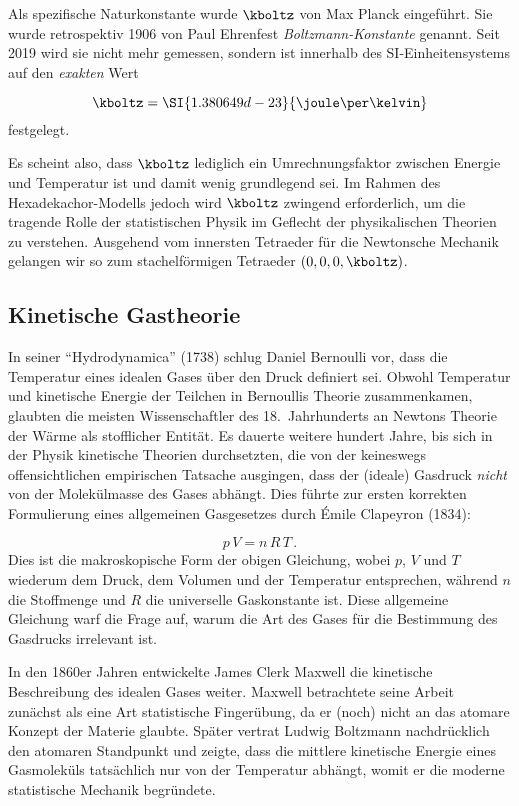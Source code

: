 \documentclass{scrartcl}
\begin{document}
Als spezifische Naturkonstante wurde $\kboltz$ von Max Planck eingeführt. Sie wurde retrospektiv 1906 von Paul Ehrenfest \emph{Boltzmann-Konstante} genannt. Seit 2019 wird sie nicht mehr gemessen, sondern ist innerhalb des SI-Einheitensystems auf den \emph{exakten} Wert

\begin{equation*}
  \kboltz=\SI{1.380649d-23}{\joule \per \kelvin}
\end{equation*}
%
festgelegt.

Es scheint also, dass $\kboltz$ lediglich ein Umrechnungsfaktor zwischen Energie und Temperatur ist und damit wenig grundlegend sei. Im Rahmen des Hexadekachor-Modells jedoch wird $\kboltz$ zwingend erforderlich, um die tragende Rolle der statistischen Physik im Geflecht der physikalischen Theorien zu verstehen. Ausgehend vom innersten Tetraeder für die Newtonsche Mechanik gelangen wir so zum stachelförmigen Tetraeder $(0,0,0,\kboltz)$.


\subsection*{Kinetische Gastheorie}

In seiner \enquote{Hydrodynamica} (1738) schlug Daniel Bernoulli vor, dass die Temperatur eines idealen Gases über den Druck definiert sei. Obwohl Temperatur und kinetische Energie der Teilchen in Bernoullis Theorie zusammenkamen, glaubten die meisten Wissenschaftler des 18.\ Jahrhunderts an Newtons Theorie der Wärme als stofflicher Entität. Es dauerte weitere hundert Jahre, bis sich in der Physik kinetische Theorien durchsetzten, die von der keineswegs offensichtlichen empirischen Tatsache ausgingen, dass der (ideale) Gasdruck \emph{nicht} von der Molekülmasse des Gases abhängt. Dies führte zur ersten korrekten Formulierung eines allgemeinen Gasgesetzes durch Émile Clapeyron (1834):

\begin{equation*}\label{eq:ideal-nr}
  p\, V=n\, R\, T\,.
\end{equation*}
%
Dies ist die makroskopische Form der obigen Gleichung, wobei $p$, $V$ und $T$ wiederum dem Druck, dem Volumen und der Temperatur entsprechen, während $n$ die Stoffmenge und $R$ die universelle Gaskonstante ist. Diese allgemeine Gleichung warf die Frage auf, warum die Art des Gases für die Bestimmung des Gasdrucks irrelevant ist.

In den 1860er Jahren entwickelte James Clerk Maxwell die kinetische Beschreibung des idealen Gases weiter. Maxwell betrachtete seine Arbeit zunächst als eine Art statistische Fingerübung, da er (noch) nicht an das atomare Konzept der Materie glaubte. Später vertrat Ludwig Boltzmann nachdrücklich den atomaren Standpunkt und zeigte, dass die mittlere kinetische Energie eines Gasmoleküls tatsächlich nur von der Temperatur abhängt, womit er die moderne statistische Mechanik begründete.
\end{document}

